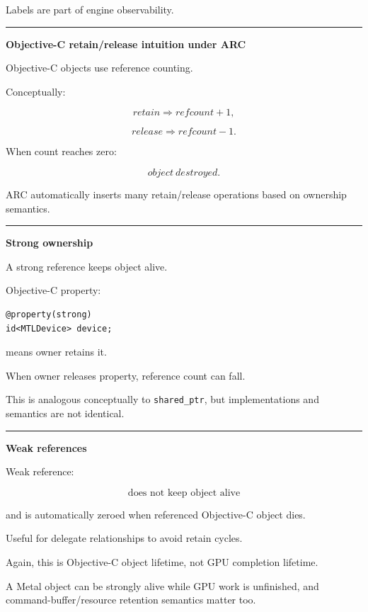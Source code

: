 Labels are part of engine observability.

\begin{center}\rule{0.5\linewidth}{0.5pt}\end{center}

\textbf{Objective-C retain/release intuition under ARC}

Objective-C objects use reference counting.

Conceptually:

\[
retain
\Rightarrow
refcount+1,
\]

\[
release
\Rightarrow
refcount-1.
\]

When count reaches zero:

\[
object\ destroyed.
\]

ARC automatically inserts many retain/release operations based on ownership semantics.

\begin{center}\rule{0.5\linewidth}{0.5pt}\end{center}

\textbf{Strong ownership}

A strong reference keeps object alive.

Objective-C property:

\begin{verbatim}
@property(strong)
id<MTLDevice> device;
\end{verbatim}

means owner retains it.

When owner releases property, reference count can fall.

This is analogous conceptually to \texttt{shared\_ptr}, but implementations and semantics are not identical.

\begin{center}\rule{0.5\linewidth}{0.5pt}\end{center}

\textbf{Weak references}

Weak reference:

\[
\boxed{\text{does not keep object alive}}
\]

and is automatically zeroed when referenced Objective-C object dies.

Useful for delegate relationships to avoid retain cycles.

Again, this is Objective-C object lifetime, not GPU completion lifetime.

A Metal object can be strongly alive while GPU work is unfinished, and command-buffer/resource retention semantics matter too.

